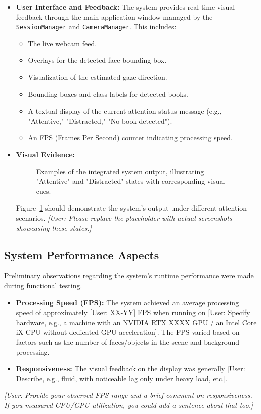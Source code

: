 \begin{itemize}
    \item \textbf{User Interface and Feedback:} The system provides real-time visual feedback through the main application window managed by the \texttt{SessionManager} and \texttt{CameraManager}. This includes:
    \begin{itemize}
        \item The live webcam feed.
        \item Overlays for the detected face bounding box.
        \item Visualization of the estimated gaze direction.
        \item Bounding boxes and class labels for detected books.
        \item A textual display of the current attention status message (e.g., "Attentive," "Distracted," "No book detected").
        \item An FPS (Frames Per Second) counter indicating processing speed.
    \end{itemize}
    
    \item \textbf{Visual Evidence:}
    \begin{figure}[h!]
        \centering
        \framebox[\textwidth][c]{\raisebox{0pt}[6cm][4cm]{Placeholder: Composite Screenshot of Different Attention States (Attentive, Distracted)}}
        \caption{Examples of the integrated system output, illustrating "Attentive" and "Distracted" states with corresponding visual cues.}
        \label{fig:attention_states_output}
    \end{figure}
    Figure~\ref{fig:attention_states_output} should demonstrate the system's output under different attention scenarios. \textit{[User: Please replace the placeholder with actual screenshots showcasing these states.]}
\end{itemize}

\subsection{System Performance Aspects}
Preliminary observations regarding the system's runtime performance were made during functional testing.
\begin{itemize}
    \item \textbf{Processing Speed (FPS):} The system achieved an average processing speed of approximately [User: XX-YY] FPS when running on [User: Specify hardware, e.g., a machine with an NVIDIA RTX XXXX GPU / an Intel Core iX CPU without dedicated GPU acceleration]. The FPS varied based on factors such as the number of faces/objects in the scene and background processing.
    \item \textbf{Responsiveness:} The visual feedback on the display was generally [User: Describe, e.g., fluid, with noticeable lag only under heavy load, etc.].
\end{itemize}
\textit{[User: Provide your observed FPS range and a brief comment on responsiveness. If you measured CPU/GPU utilization, you could add a sentence about that too.]}

